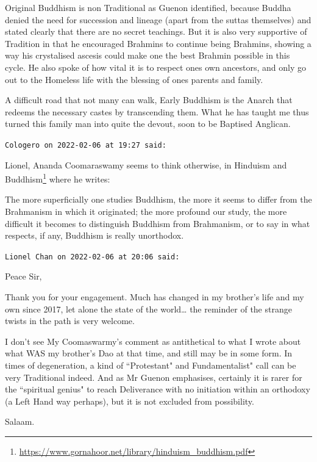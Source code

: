 \begin{footnotesize}
\begin{sffamily}
Original Buddhism is non Traditional as Guenon identified, because Buddha denied the need for succession and lineage (apart from the suttas themselves) and stated clearly that there are no secret teachings. But it is also very supportive of Tradition in that he encouraged Brahmins to continue being Brahmins, showing a way his crystalised ascesis could make one the best Brahmin possible in this cycle. He also spoke of how vital it is to respect ones own ancestors, and only go out to the Homeless life with the blessing of ones parents and family. 

A difficult road that not many can walk, Early Buddhism is the Anarch that redeems the necessary castes by transcending them. What he has taught me thus turned this family man into quite the devout, soon to be Baptised Anglican.


\hfill

\texttt{Cologero on 2022-02-06 at 19:27 said: }

Lionel, Ananda Coomaraswamy seems to think otherwise, in Hinduism and Buddhism\footnote{\url{https://www.gornahoor.net/library/hinduism_buddhism.pdf}} where he writes:

\begin{quotex}
The more superficially one studies Buddhism, the more it seems to differ from the Brahmanism in which it originated; the more profound our study, the more difficult it becomes to distinguish Buddhism from Brahmanism, or to say in what respects, if any, Buddhism is really unorthodox.
\end{quotex}


\hfill

\texttt{Lionel Chan on 2022-02-06 at 20:06 said: }

Peace Sir,

Thank you for your engagement. Much has changed in my brother's life and my own since 2017, let alone the state of the world… the reminder of the strange twists in the path is very welcome.

I don't see My Coomaswarmy's comment as antithetical to what I wrote about what WAS my brother's Dao at that time, and still may be in some form. In times of degeneration, a kind of ``Protestant" and Fundamentalist" call can be very Traditional indeed. And as Mr Guenon emphasises, certainly it is rarer for the ``spiritual genius" to reach Deliverance with no initiation within an orthodoxy (a Left Hand way perhaps), but it is not excluded from possibility.

Salaam.


\end{sffamily}\end{footnotesize}
